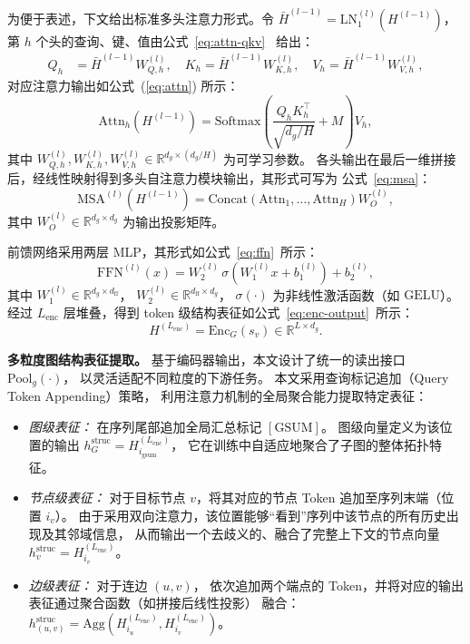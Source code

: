 为便于表述，下文给出标准多头注意力形式。令
$\bar{H}^{(l-1)}=\mathrm{LN}_1^{(l)}(H^{(l-1)})$，
第 $h$ 个头的查询、键、值由公式~\ref{eq:attn-qkv} \ 给出：
\begin{align}
  Q_h &= \bar{H}^{(l-1)} W^{(l)}_{Q,h},\quad
  K_h = \bar{H}^{(l-1)} W^{(l)}_{K,h},\quad
  V_h = \bar{H}^{(l-1)} W^{(l)}_{V,h},
  \label{eq:attn-qkv}
\end{align}
对应注意力输出如公式~(\ref{eq:attn}) 所示：
\begin{equation}
  \mathrm{Attn}_h(H^{(l-1)})
  = \mathrm{Softmax}\!\left(
       \frac{Q_h K_h^\top}{\sqrt{d_g/H}} + M
     \right) V_h,
  \label{eq:attn}
\end{equation}
其中 $W^{(l)}_{Q,h},W^{(l)}_{K,h},W^{(l)}_{V,h}\in\mathbb{R}^{d_g\times(d_g/H)}$ 为可学习参数。
各头输出在最后一维拼接后，经线性映射得到多头自注意力模块输出，其形式可写为
公式~\ref{eq:msa}：
\begin{equation}
  \mathrm{MSA}^{(l)}(H^{(l-1)})
  = \mathrm{Concat}\!\left(\mathrm{Attn}_1,\dots,\mathrm{Attn}_H\right) W^{(l)}_O,
  \label{eq:msa}
\end{equation}
其中 $W^{(l)}_O\in\mathbb{R}^{d_g\times d_g}$ 为输出投影矩阵。

前馈网络采用两层 MLP，其形式如公式~\ref{eq:ffn}\  所示：
\begin{equation}
  \mathrm{FFN}^{(l)}(x)
  = W^{(l)}_2\, \sigma\!\left(W^{(l)}_1 x + b^{(l)}_1\right) + b^{(l)}_2,
  \label{eq:ffn}
\end{equation}
其中 $W^{(l)}_1\in\mathbb{R}^{d_g\times d_{\mathrm{ff}}}$，
$W^{(l)}_2\in\mathbb{R}^{d_{\mathrm{ff}}\times d_g}$，
$\sigma(\cdot)$ 为非线性激活函数（如 $\mathrm{GELU}$）。
经过 $L_{\mathrm{enc}}$ 层堆叠，得到 token 级结构表征如公式~\ref{eq:enc-output}\  所示：
\begin{equation}
  H^{(L_{\mathrm{enc}})} = \mathrm{Enc}_G(s_v)\in \mathbb{R}^{L\times d_g}.
  \label{eq:enc-output}
\end{equation}



\textbf{多粒度图结构表征提取。}
基于编码器输出，本文设计了统一的读出接口 $\mathrm{Pool}_g(\cdot)$，
以灵活适配不同粒度的下游任务。
本文采用查询标记追加（Query Token Appending）策略，
利用注意力机制的全局聚合能力提取特定表征：\begin{itemize}\item \textit{图级表征：} 在序列尾部追加全局汇总标记 $[\mathrm{GSUM}]$。
图级向量定义为该位置的输出 
$h_G^{\mathrm{struc}} = H^{(L_{\mathrm{enc}})}_{i_{\mathrm{gsum}}}$，
它在训练中自适应地聚合了子图的整体拓扑特征。\item \textit{节点级表征：} 
对于目标节点 $v$，将其对应的节点 Token 追加至序列末端（位置 $i_v$）。
由于采用双向注意力，该位置能够“看到”序列中该节点的所有历史出现及其邻域信息，
从而输出一个去歧义的、融合了完整上下文的节点向量 $h_v^{\mathrm{struc}} =
 H^{(L_{\mathrm{enc}})}_{i_v}$。\item \textit{边级表征：} 对于连边 $(u,v)$，
 依次追加两个端点的 Token，并将对应的输出表征通过聚合函数（如拼接后线性投影）
 融合：$h_{(u,v)}^{\mathrm{struc}} = \mathrm{Agg}(H^{(L_{\mathrm{enc}})}_{i_u}, 
 H^{(L_{\mathrm{enc}})}_{i_v})$。\end{itemize}
 
